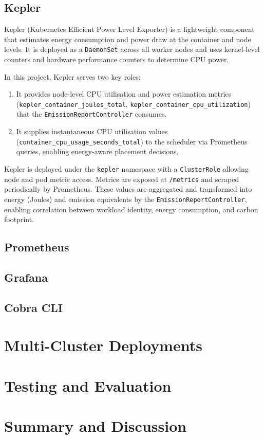 \documentclass{article}
\begin{document}
\subsection{Kepler}

Kepler (Kubernetes Efficient Power Level Exporter) is a lightweight component that
estimates energy consumption and power draw at the container 
and node levels. It is deployed as a \texttt{DaemonSet} across all worker
nodes and uses kernel-level counters and hardware performance counters
to determine CPU power.

In this project, Kepler serves two key roles:
\begin{enumerate}
  \item It provides node-level CPU utilisation and power estimation metrics (\texttt{kepler\_container\_joules\_total}, \texttt{kepler\_container\_cpu\_utilization}) that the \texttt{EmissionReportController} consumes.
  \item It supplies instantaneous CPU utilisation values (\texttt{container\_cpu\_usage\_seconds\_total}) to the scheduler via Prometheus queries, enabling energy-aware placement decisions.
\end{enumerate}

Kepler is deployed under the \texttt{kepler} namespace with a \texttt{ClusterRole} 
allowing node and pod metric access. Metrics are exposed at 
\texttt{/metrics} and scraped periodically by Prometheus. 
These values are aggregated and transformed into energy 
(Joules) and emission equivalents by the \texttt{EmissionReportController}, 
enabling correlation between workload identity, energy consumption, and carbon footprint.

\subsection{Prometheus}

\subsection{Grafana}

\subsection{Cobra CLI}

\section{Multi-Cluster Deployments}

\section{Testing and Evaluation}

\section{Summary and Discussion}


\nocite{*}


\end{document}
